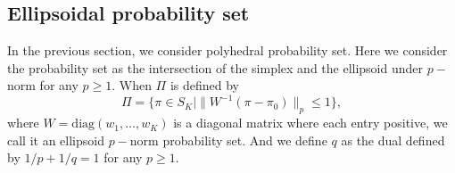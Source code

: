 \documentclass[12pt]{article}
\begin{document}




\subsection{Ellipsoidal probability set}
In the previous section, we consider polyhedral probability set. Here we consider the probability set as the intersection of the simplex and the ellipsoid under $p-$norm for any $p\geq 1$.
When $\Pi$ is defined by 
\[
\Pi = \{\pi \in S_K \mid \| W^{-1}(\pi - \pi_0)\|_{p}\leq 1\},
\]
where $W = 
\mbox{diag}(w_1,\ldots, w_K) $ 
is a diagonal matrix where each entry positive, we call it an ellipsoid $p-$norm probability set. And we define $q$ as the dual defined by $1/p+1/q =1$ for any $p\geq 1$. 

\end{document}
